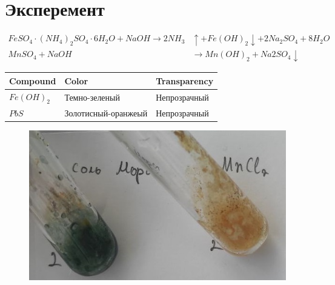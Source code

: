 \section{Эксперемент}
\begin{eqnarray} 
    FeSO_4 \cdot (NH_4)_2SO_4\cdot 6H_2O + 
    NaOH \xrightarrow{} 
    2NH_3 &\uparrow + Fe(OH)_2 \downarrow + 
    2Na_2SO_4 + 8H_2O \\
    MnSO_4 + NaOH &\xrightarrow{} 
    Mn(OH)_2 + Na2SO_4 \downarrow
\end{eqnarray} 

\begin{center}
    \begin{tabular}{l||l||l}
        Compound & Color & Transparency \\ \hline \hline
        $Fe(OH)_2$ & Темно-зеленый &    Непрозрачный \\
        $PbS$ & Золотисный-оранжеый &    Непрозрачный 
    \end{tabular}
\end{center}

\begin{figure}[h]
    \centering
    \includegraphics[width=1\linewidth]{Ex_2/1.jpg}
     \caption{}
    \label{ex_2_1}
\end{figure}

